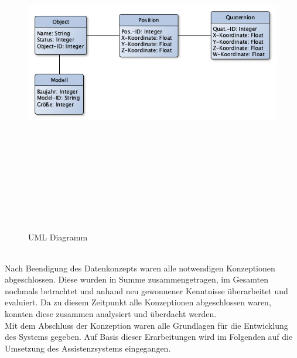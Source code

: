 \begin{figure}[hbt!]
    \centering
    \includegraphics[width=15cm,height=15cm,keepaspectratio]{3Konzeption/Bilder/UML_BA.png}
    \caption{UML Diagramm}
    \label{pic:erm}
\end{figure}
\\
Nach Beendigung des Datenkonzepts waren alle notwendigen Konzeptionen abgeschlossen. Diese wurden in Summe zusammengetragen, im Gesamten nochmals 
betrachtet und anhand neu gewonnener Kenntnisse überarbeitet und evaluiert. Da zu diesem Zeitpunkt alle Konzeptionen abgeschlossen 
waren, konnten diese zusammen analysiert und überdacht werden. 
\\ 
\linebreak
Mit dem Abschluss der Konzeption waren alle Grundlagen für die Entwicklung des Systems gegeben. Auf Basis dieser Erarbeitungen wird im Folgenden auf die 
Umsetzung des Assistenzsystems eingegangen.
